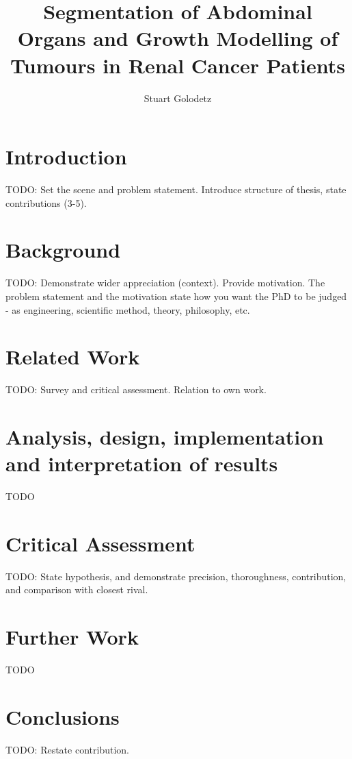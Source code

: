 \documentclass[a4paper,12pt]{book}
\begin{document}
\author{Stuart Golodetz}
\title{Segmentation of Abdominal Organs and Growth Modelling of Tumours in Renal Cancer Patients}
\date{}
\maketitle

\chapter{Introduction}

TODO: Set the scene and problem statement. Introduce structure of thesis, state contributions (3-5).

\chapter{Background}

TODO: Demonstrate wider appreciation (context). Provide motivation. The problem statement and the motivation state how you want the PhD to be judged - as engineering, scientific method, theory, philosophy, etc.

\chapter{Related Work}

TODO: Survey and critical assessment. Relation to own work. 

\chapter{Analysis, design, implementation and interpretation of results}

TODO

\chapter{Critical Assessment}

TODO: State hypothesis, and demonstrate precision, thoroughness, contribution, and comparison with closest rival.

\chapter{Further Work}

TODO

\chapter{Conclusions}

TODO: Restate contribution.
\end{document}
